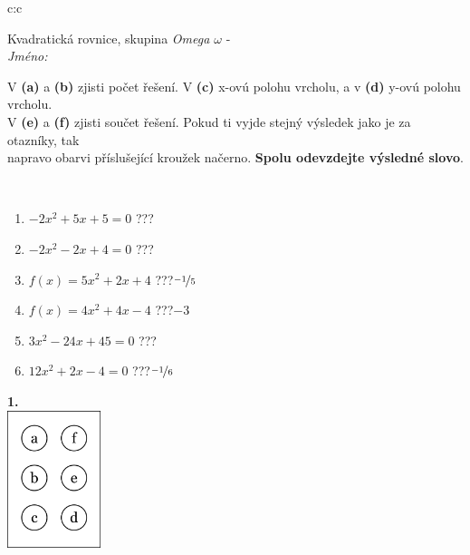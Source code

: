 \documentclass[10pt]{report}
\begin{document}
\begin{tabular}{c:c}
\begin{minipage}[c][104.5mm][t]{0.5\linewidth}
\begin{center}
\vspace{7mm}
{\huge Kvadratická rovnice, skupina \textit{Omega $\omega$} -}\\[5mm]
\textit{Jméno:}\phantom{xxxxxxxxxxxxxxxxxxxxxxxxxxxxxxxxxxxxxxxxxxxxxxxxxxxxxxxxxxxxxxxxx}\\[5mm]
\begin{minipage}{0.95\linewidth}
\begin{center}
V \textbf{(a)} a \textbf{(b)} zjisti počet řešení. V \textbf{(c)} x-ovú polohu vrcholu, a v \textbf{(d)} y-ovú polohu vrcholu.\\V \textbf{(e)} a \textbf{(f)} zjisti součet řešení. Pokud ti vyjde stejný výsledek jako je za otazníky, tak\\napravo obarvi příslušející kroužek načerno. \textbf{Spolu odevzdejte výsledné slovo}.
\end{center}
\end{minipage}
\\[1mm]
\begin{minipage}{0.79\linewidth}
\begin{center}
\begin{varwidth}{\linewidth}
\begin{enumerate}
\Large
\item $-2x^2+5x+5=0$\quad \dotfill\; ???\;\dotfill {}
\item $-2x^2-2x+4=0$\quad \dotfill\; ???\;\dotfill {}
\item $f(x)=5x^2+2x+4$\quad \dotfill\; ???\;\dotfill \quad $\nicefrac{-1}{5}$
\item $f(x)=4x^2+4x-4$\quad \dotfill\; ???\;\dotfill \quad $-3$
\item $3x^2-24x+45=0$\quad \dotfill\; ???\;\dotfill {}
\item $12x^2+2x-4=0$\quad \dotfill\; ???\;\dotfill \quad $\nicefrac{-1}{6}$
\end{enumerate}
\end{varwidth}
\end{center}
\end{minipage}
\begin{minipage}{0.20\linewidth}
\begin{center}
{\Huge\bfseries 1.} \\[2mm]
\includegraphics[height=40mm]{../images/braille.png}

\end{center}
\end{minipage}
\end{center}
\end{minipage}
\end{tabular}
\end{document}
